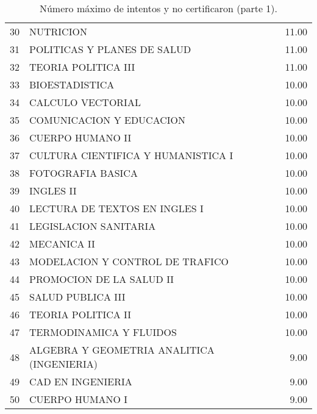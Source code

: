 \documentclass[12pt]{article}
\begin{document}
\begin{table}[ht]
{\begin{tabular}{rlr}
  30 & NUTRICION & 11.00 \\ 
  31 & POLITICAS Y PLANES DE SALUD & 11.00 \\ 
  32 & TEORIA POLITICA III & 11.00 \\ 
  33 & BIOESTADISTICA & 10.00 \\ 
  34 & CALCULO VECTORIAL & 10.00 \\ 
  35 & COMUNICACION Y EDUCACION & 10.00 \\ 
  36 & CUERPO HUMANO II & 10.00 \\ 
  37 & CULTURA CIENTIFICA Y HUMANISTICA I & 10.00 \\ 
  38 & FOTOGRAFIA BASICA & 10.00 \\ 
  39 & INGLES II & 10.00 \\ 
  40 & LECTURA DE TEXTOS EN INGLES I & 10.00 \\ 
  41 & LEGISLACION SANITARIA & 10.00 \\ 
  42 & MECANICA II & 10.00 \\ 
  43 & MODELACION Y CONTROL DE TRAFICO & 10.00 \\ 
  44 & PROMOCION DE LA SALUD II & 10.00 \\ 
  45 & SALUD PUBLICA III & 10.00 \\ 
  46 & TEORIA POLITICA II & 10.00 \\ 
  47 & TERMODINAMICA Y FLUIDOS & 10.00 \\ 
  48 & ALGEBRA Y GEOMETRIA ANALITICA (INGENIERIA) & 9.00 \\ 
  49 & CAD EN INGENIERIA & 9.00 \\ 
  50 & CUERPO HUMANO I & 9.00 \\ 
   \hline
\end{tabular}
}
\caption{\label{Num_Max_Intentos_Nunca_Cert_1} N\'umero m\'aximo de intentos y no certificaron (parte 1).}

\end{table}
\end{document}
